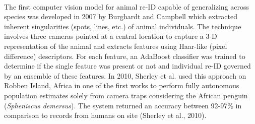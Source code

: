 \documentclass[11pt]{article}
\begin{document}
\newline
\\
The first computer vision model for animal re-ID capable of generalizing across species was developed in 2007 by Burghardt and Campbell which extracted inherent singularities (spots, lines, etc.) of animal individuals. The technique involves three cameras pointed at a central location to capture a 3-D representation of the animal and extracts features using Haar-like (pixel difference) descriptors. For each feature, an AdaBoost classifier was trained to determine if the single feature was present or not and individual re-ID governed by an ensemble of these features. In 2010, Sherley et al. used this approach on Robben Island, Africa in one of the first works to perform fully autonomous population estimates solely from camera traps considering the African penguin (\textit{Spheniscus demersus}). The system returned an accuracy between 92-97\% in comparison to records from humans on site (Sherley et al., 2010). 
\newline
\\
\end{document}
